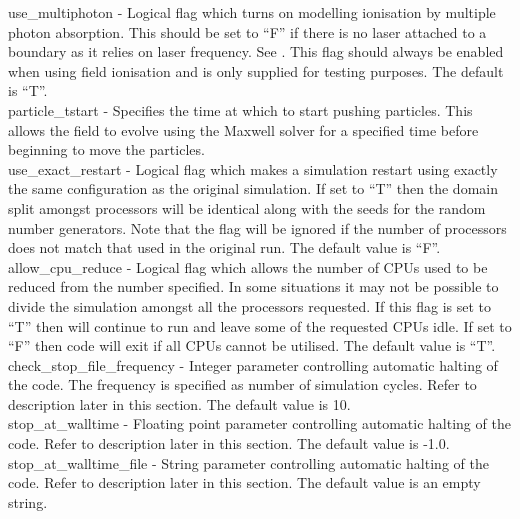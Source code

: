 {\emphtext use\_multiphoton} - Logical flag which turns on modelling
  ionisation by multiple photon absorption. This should be set to ``F'' if
  there is no laser attached to a boundary as it relies on laser frequency.
  See . This flag should always be enabled when
  using field ionisation and is only supplied for testing purposes.
  The default is ``T''.\\

{\emphtext particle\_tstart} - Specifies the time at which to start pushing
particles. This allows the field to evolve using the Maxwell solver for a
specified time before beginning to move the particles.\\

{\emphtext use\_exact\_restart} - Logical flag which makes a simulation
  restart using exactly the same configuration as the original simulation. If
  set to ``T'' then the domain split amongst processors will be identical
  along with the seeds for the random number generators. Note that the flag
  will be ignored if the number of processors does not match that used in the
  original run. The default value is ``F''.\\

{\emphtext allow\_cpu\_reduce} - Logical flag which allows the number of CPUs
  used to be reduced from the number specified. In some situations it may not
  be possible to divide the simulation amongst all the processors requested.
  If this flag is set to ``T'' then {\EPOCH} will continue to run and leave
  some of the requested CPUs idle. If set to ``F'' then code will exit if all
  CPUs cannot be utilised. The default value is ``T''.\\

{\emphtext check\_stop\_file\_frequency} - Integer parameter controlling
  automatic halting of the code. The frequency is specified as number of
  simulation cycles. Refer to description later in this section.
  The default value is 10.\\

{\emphtext stop\_at\_walltime} - Floating point parameter controlling
  automatic halting of the code. Refer to description later in this section.
  The default value is -1.0.\\

{\emphtext stop\_at\_walltime\_file} - String parameter controlling
  automatic halting of the code. Refer to description later in this section.
  The default value is an empty string.\\

